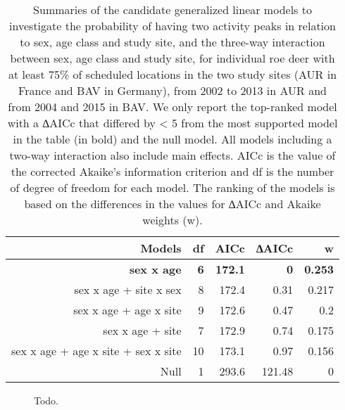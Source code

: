 \documentclass[a4paper,11pt]{article}
\begin{document}
\begin{table}[htbp]
  \centering
  \caption{Summaries of the candidate generalized linear models to
    investigate the probability of having two activity peaks in
    relation to sex, age class and study site, and the three-way
    interaction between sex, age class and study site, for individual
    roe deer with at least 75\% of scheduled locations in the two
    study sites (AUR in France and BAV in Germany), from 2002 to 2013
    in AUR and from 2004 and 2015 in BAV. We only report the
    top-ranked model with a ∆AICc that differed by < 5 from the most
    supported model in the table (in bold) and the null model. All
    models including a two-way interaction also include main
    effects. AICc is the value of the corrected Akaike’s information
    criterion and df is the number of degree of freedom for each
    model. The ranking of the models is based on the differences in
    the values for ∆AICc and Akaike weights (w).}
  
    \begin{tabular}{rrrrr}
    \\
    \hline
        Models & df    & AICc  & ∆AICc & w \\
    \hline
    \textbf{sex x age} & \textbf{6}     & \textbf{172.1} & \textbf{0}     & \textbf{0.253} \\
    sex x age  + site x sex & 8     & 172.4 & 0.31  & 0.217 \\
    sex x age + age x site & 9     & 172.6 & 0.47  & 0.2 \\
    sex x age + site & 7     & 172.9 & 0.74  & 0.175 \\
    sex x age + age x site + sex x site & 10    & 173.1 & 0.97  & 0.156 \\
    Null  & 1     & 293.6 & 121.48 & 0 \\
    \hline
    \end{tabular}
  \label{tab:addlabel}
\end{table}

\newpage

\begin{figure} [!h]
\centering
\caption{Todo.}
\end{figure}
\end{document}
